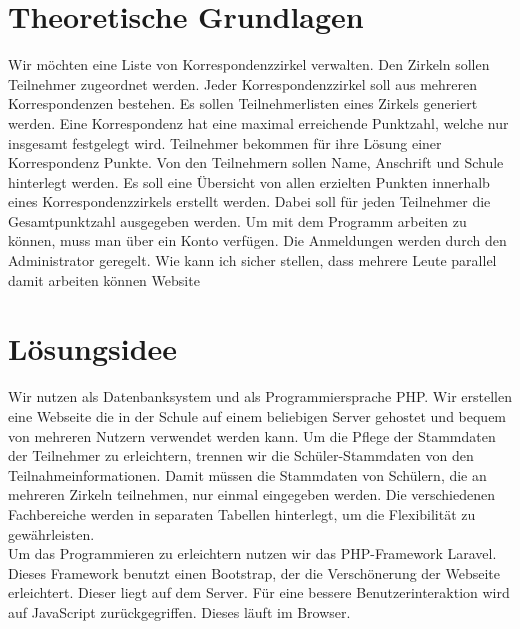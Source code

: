 \chapter{Theoretische Grundlagen}
Wir möchten eine Liste von Korrespondenzzirkel verwalten. Den Zirkeln sollen Teilnehmer zugeordnet werden. Jeder Korrespondenzzirkel soll aus mehreren Korrespondenzen bestehen. Es sollen Teilnehmerlisten eines Zirkels generiert werden. Eine Korrespondenz hat eine maximal erreichende Punktzahl, welche nur insgesamt festgelegt wird. Teilnehmer bekommen für ihre Lösung einer Korrespondenz Punkte. Von den Teilnehmern sollen Name, Anschrift und Schule hinterlegt werden. Es soll eine Übersicht von allen erzielten Punkten innerhalb eines Korrespondenzzirkels erstellt werden. Dabei soll für jeden Teilnehmer die Gesamtpunktzahl ausgegeben werden. Um mit dem Programm arbeiten zu können, muss man über ein Konto verfügen. Die Anmeldungen werden durch den Administrator geregelt. 
Wie kann ich sicher stellen, dass mehrere Leute parallel damit arbeiten können Website

\chapter{Lösungsidee}
Wir nutzen als Datenbanksystem und als Programmiersprache PHP. Wir erstellen eine Webseite die in der Schule auf einem beliebigen Server gehostet und bequem von mehreren Nutzern verwendet werden kann. Um die Pflege der Stammdaten der Teilnehmer zu erleichtern, trennen wir die Schüler-Stammdaten von den Teilnahmeinformationen. Damit müssen die Stammdaten von Schülern, die an mehreren Zirkeln teilnehmen, nur einmal eingegeben werden. Die verschiedenen Fachbereiche werden in separaten Tabellen hinterlegt, um die Flexibilität zu gewährleisten.\\ 
Um das Programmieren zu erleichtern nutzen wir das PHP-Framework Laravel. Dieses Framework benutzt einen Bootstrap, der die Verschönerung der Webseite erleichtert. Dieser liegt auf dem Server.  Für eine bessere Benutzerinteraktion  wird auf JavaScript zurückgegriffen. Dieses läuft im Browser.\\
